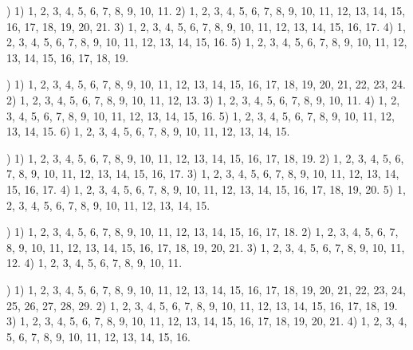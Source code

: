 \documentclass[a4paper,11pt]{article}
\begin{document}
\vspace{\spaceFour}



\noindent
{}) 1) 1, 2, 3, 4, 5, 6, 7, 8, 9, 10, 11. 2) 1, 2, 3, 4,
5, 6, 7, 8, 9, 10, 11, 12, 13, 14, 15, 16, 17, 18, 19, 20, 21.
3) 1, 2, 3, 4, 5, 6, 7, 8, 9, 10, 11, 12, 13, 14, 15, 16, 17.
4) 1, 2, 3, 4, 5, 6, 7, 8, 9, 10, 11, 12, 13, 14, 15, 16.
5) 1, 2, 3, 4, 5, 6, 7, 8, 9, 10, 11, 12, 13, 14, 15, 16, 17, 18, 19.

\vspace{\spaceFour}



\noindent
{}) 1) 1, 2, 3, 4, 5, 6, 7, 8, 9, 10, 11, 12, 13, 14, 15,
16, 17, 18, 19, 20, 21, 22, 23, 24. 2) 1, 2, 3, 4, 5, 6, 7, 8, 9, 10,
11, 12, 13. 3) 1, 2, 3, 4, 5, 6, 7, 8, 9, 10, 11.
4) 1, 2, 3, 4, 5, 6, 7, 8, 9, 10, 11, 12, 13, 14, 15, 16.
5) 1, 2, 3, 4, 5, 6, 7, 8, 9, 10, 11, 12, 13, 14, 15.
6) 1, 2, 3, 4, 5, 6, 7, 8, 9, 10, 11, 12, 13, 14, 15.

\vspace{\spaceFour}



\noindent
{}) 1) 1, 2, 3, 4, 5, 6, 7, 8, 9, 10, 11, 12, 13, 14, 15,
16, 17, 18, 19. 2) 1, 2, 3, 4, 5, 6, 7, 8, 9, 10, 11, 12, 13, 14, 15,
16, 17. 3) 1, 2, 3, 4, 5, 6, 7, 8, 9, 10, 11, 12, 13, 14, 15, 16, 17.
4) 1, 2, 3, 4, 5, 6, 7, 8, 9, 10, 11, 12, 13, 14, 15, 16, 17, 18, 19, 20.
5) 1, 2, 3, 4, 5, 6, 7, 8, 9, 10, 11, 12, 13, 14, 15.

\vspace{\spaceFour}



\noindent
{}) 1) 1, 2, 3, 4, 5, 6, 7, 8, 9, 10, 11, 12, 13, 14, 15, 16,
17, 18. 2) 1, 2, 3, 4, 5, 6, 7, 8, 9, 10, 11, 12, 13, 14, 15, 16, 17, 18,
19, 20, 21. 3) 1, 2, 3, 4, 5, 6, 7, 8, 9, 10, 11, 12. 4) 1, 2, 3, 4, 5, 6,
7, 8, 9, 10, 11.

\vspace{\spaceFour}



\noindent
{}) 1) 1, 2, 3, 4, 5, 6, 7, 8, 9, 10, 11, 12, 13, 14, 15,
16, 17, 18, 19, 20, 21, 22, 23, 24, 25, 26, 27, 28, 29.
2) 1, 2, 3, 4, 5, 6, 7, 8, 9, 10, 11, 12, 13, 14, 15, 16, 17, 18, 19.
3) 1, 2, 3, 4, 5, 6, 7, 8, 9, 10, 11, 12, 13, 14, 15, 16, 17, 18, 19,
20, 21. 4) 1, 2, 3, 4, 5, 6, 7, 8, 9, 10, 11, 12, 13, 14, 15, 16.

\vspace{\spaceTwo}
\end{document}
